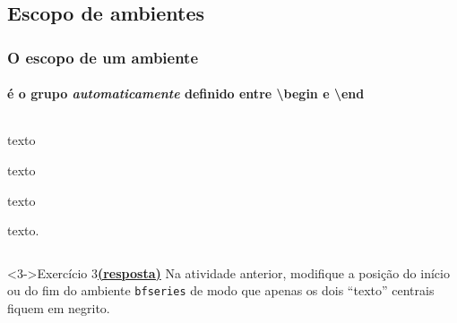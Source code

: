 \documentclass[handout,10pt]{beamer}
\begin{document}
\subsection{Escopo de ambientes}
\begin{frame}[fragile]
	\frametitle{O escopo de um ambiente}
	\framesubtitle{é o grupo \emph{automaticamente} definido entre {\sffamily\textbackslash begin} e {\sffamily\textbackslash end}}
	
	\vfill
	
	\begin{columns}
		\begin{atividade}{4}%
			\begin{LaTeXcode}%
				texto
				\begin{bfseries}%
				  texto
				  \begin{itshape}%
				    texto
				  \end{itshape}%
				  texto.
				\end{bfseries}
			\end{LaTeXcode}
		\end{atividade}
		
		
	\end{columns}
	
	\begin{block}<3->{Exercício 3\hfill \hyperlink{respostas}{\footnotesize\textbf{(resposta)}}}
		Na atividade anterior, modifique a posição do início ou do fim do ambiente \texttt{bfseries}
		de modo que apenas os dois ``texto'' centrais fiquem em negrito.
	\end{block}	
		
\end{frame}
\end{document}

